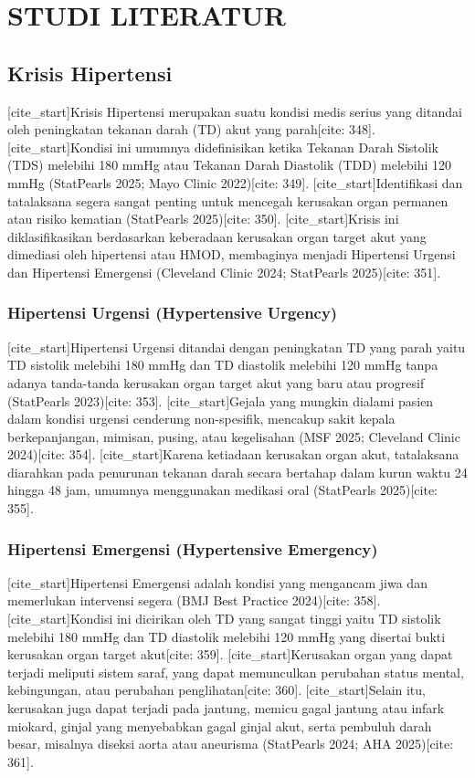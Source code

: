 \chapter{STUDI LITERATUR}
\label{chap:studi-literatur}

\section{Krisis Hipertensi}
[cite_start]Krisis Hipertensi merupakan suatu kondisi medis serius yang ditandai oleh peningkatan tekanan darah (TD) akut yang parah[cite: 348]. [cite_start]Kondisi ini umumnya didefinisikan ketika Tekanan Darah Sistolik (TDS) melebihi 180 mmHg atau Tekanan Darah Diastolik (TDD) melebihi 120 mmHg (StatPearls 2025; Mayo Clinic 2022)[cite: 349]. [cite_start]Identifikasi dan tatalaksana segera sangat penting untuk mencegah kerusakan organ permanen atau risiko kematian (StatPearls 2025)[cite: 350]. [cite_start]Krisis ini diklasifikasikan berdasarkan keberadaan kerusakan organ target akut yang dimediasi oleh hipertensi atau HMOD, membaginya menjadi Hipertensi Urgensi dan Hipertensi Emergensi (Cleveland Clinic 2024; StatPearls 2025)[cite: 351].

\subsection{Hipertensi Urgensi (Hypertensive Urgency)}
[cite_start]Hipertensi Urgensi ditandai dengan peningkatan TD yang parah yaitu TD sistolik melebihi 180 mmHg dan TD diastolik melebihi 120 mmHg tanpa adanya tanda-tanda kerusakan organ target akut yang baru atau progresif (StatPearls 2023)[cite: 353]. [cite_start]Gejala yang mungkin dialami pasien dalam kondisi urgensi cenderung non-spesifik, mencakup sakit kepala berkepanjangan, mimisan, pusing, atau kegelisahan (MSF 2025; Cleveland Clinic 2024)[cite: 354]. [cite_start]Karena ketiadaan kerusakan organ akut, tatalaksana diarahkan pada penurunan tekanan darah secara bertahap dalam kurun waktu 24 hingga 48 jam, umumnya menggunakan medikasi oral (StatPearls 2025)[cite: 355].

\subsection{Hipertensi Emergensi (Hypertensive Emergency)}
[cite_start]Hipertensi Emergensi adalah kondisi yang mengancam jiwa dan memerlukan intervensi segera (BMJ Best Practice 2024)[cite: 358]. [cite_start]Kondisi ini dicirikan oleh TD yang sangat tinggi yaitu TD sistolik melebihi 180 mmHg dan TD diastolik melebihi 120 mmHg yang disertai bukti kerusakan organ target akut[cite: 359]. [cite_start]Kerusakan organ yang dapat terjadi meliputi sistem saraf, yang dapat memunculkan perubahan status mental, kebingungan, atau perubahan penglihatan[cite: 360]. [cite_start]Selain itu, kerusakan juga dapat terjadi pada jantung, memicu gagal jantung atau infark miokard, ginjal yang menyebabkan gagal ginjal akut, serta pembuluh darah besar, misalnya diseksi aorta atau aneurisma (StatPearls 2024; AHA 2025)[cite: 361].

